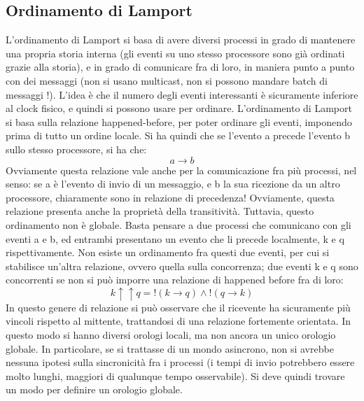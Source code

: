 \subsection{Ordinamento di Lamport}
L'ordinamento di Lamport si basa di avere diversi processi in grado di mantenere una propria storia interna (gli
eventi su uno stesso processore sono già ordinati grazie alla storia), e in grado di comunicare fra di loro, in maniera
punto a punto con dei messaggi (non si usano multicast, non si possono mandare batch di messaggi !). L'idea è che il
numero degli eventi interessanti è sicuramente inferiore al clock fisico, e quindi si possono usare per ordinare.
L'ordinamento di Lamport si basa sulla relazione happened-before, per poter ordinare gli eventi, imponendo prima di
tutto un ordine locale. Si ha quindi che se l'evento a precede l'evento b sullo stesso processore, si ha che:
\begin{equation}
 a \rightarrow b
\end{equation}
Ovviamente questa relazione vale anche per la comunicazione fra più processi, nel senso: se a è l'evento di invio di
un messaggio, e b la sua ricezione da un altro processore, chiaramente sono in relazione di precedenza! Ovviamente,
questa relazione presenta anche la proprietà della transitività.
Tuttavia, questo ordinamento non è globale. Basta pensare a due processi che comunicano con gli eventi a e b, ed
entrambi presentano un evento che li precede localmente, k e q rispettivamente. Non esiste un ordinamento fra questi
due eventi, per cui si stabilisce un'altra relazione, ovvero quella sulla concorrenza; due eventi k e q sono
concorrenti se non si può imporre una relazione di happened before fra di loro:
\begin{equation}
 k \uparrow\uparrow q =!(k \rightarrow q)\land!(q \rightarrow k)
\end{equation}
In questo genere di relazione si può osservare che il ricevente ha sicuramente più vincoli rispetto al mittente,
trattandosi di una relazione fortemente orientata. In questo modo si hanno diversi orologi locali, ma non ancora un
unico orologio globale. In particolare, se si trattasse di un mondo asincrono, non si avrebbe nessuna ipotesi sulla
sincronicità fra i processi (i tempi di invio potrebbero essere molto lunghi, maggiori di qualunque tempo osservabile).
Si deve quindi trovare un modo per definire un orologio globale.

